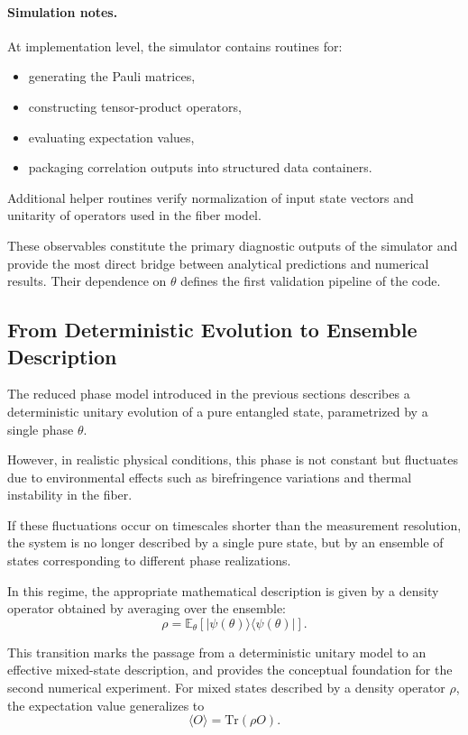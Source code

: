 \documentclass[a4paper]{article}
\begin{document}
\paragraph{Simulation notes.}
At implementation level, the simulator contains routines for:
\begin{itemize}
    \item generating the Pauli matrices,
    \item constructing tensor-product operators,
    \item evaluating expectation values,
    \item packaging correlation outputs into structured data containers.
\end{itemize}

Additional helper routines verify normalization of input state vectors and unitarity of operators used in the fiber model.

These observables constitute the primary diagnostic outputs of the simulator and provide the most direct bridge between analytical predictions and numerical results. Their dependence on \(\theta\) defines the first validation pipeline of the code.

\subsection{From Deterministic Evolution to Ensemble Description}

The reduced phase model introduced in the previous sections describes a deterministic unitary evolution of a pure entangled state, parametrized by a single phase \(\theta\).

However, in realistic physical conditions, this phase is not constant but fluctuates due to environmental effects such as birefringence variations and thermal instability in the fiber.

If these fluctuations occur on timescales shorter than the measurement resolution, the system is no longer described by a single pure state, but by an ensemble of states corresponding to different phase realizations.

In this regime, the appropriate mathematical description is given by a density operator obtained by averaging over the ensemble:
\[
\rho = \mathbb{E}_{\theta}\left[ |\psi(\theta)\rangle\langle \psi(\theta)| \right].
\]

This transition marks the passage from a deterministic unitary model to an effective mixed-state description, and provides the conceptual foundation for the second numerical experiment.
For mixed states described by a density operator \(\rho\), the expectation value generalizes to
\[
\langle O \rangle = \mathrm{Tr}(\rho O).
\]
\end{document}

